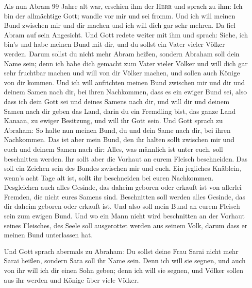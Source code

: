  Als nun Abram 99 Jahre alt war, erschien ihm der
\textsc{Herr} und sprach zu ihm: Ich bin der allmächtige Gott; wandle
vor mir und sei fromm.  Und ich will meinen Bund zwischen
mir und dir machen und ich will dich gar sehr mehren.  Da
fiel Abram auf sein Angesicht. Und Gott redete weiter mit ihm und
sprach:  Siehe, ich bin's und habe meinen Bund mit dir,
und du sollst ein Vater vieler Völker werden.  Darum
sollst du nicht mehr Abram heißen, sondern Abraham soll dein Name sein;
denn ich habe dich gemacht zum Vater vieler Völker  und
will dich gar sehr fruchtbar machen und will von dir Völker machen, und
sollen auch Könige von dir kommen.  Und ich will
aufrichten meinen Bund zwischen mir und dir und deinem Samen nach dir,
bei ihren Nachkommen, dass es ein ewiger Bund sei, also dass ich dein
Gott sei und deines Samens nach dir,  und will dir und
deinem Samen nach dir geben das Land, darin du ein Fremdling bist, das
ganze Land Kanaan, zu ewiger Besitzung, und will ihr Gott sein.
 Und Gott sprach zu Abraham: So halte nun meinen Bund, du
und dein Same nach dir, bei ihren Nachkommen.  Das ist
aber mein Bund, den ihr halten sollt zwischen mir und euch und deinem
Samen nach dir: Alles, was männlich ist unter euch, soll beschnitten
werden.  Ihr sollt aber die Vorhaut an eurem Fleisch
beschneiden. Das soll ein Zeichen sein des Bundes zwischen mir und euch.
 Ein jegliches Knäblein, wenn's acht Tage alt ist, sollt
ihr beschneiden bei euren Nachkommen. Desgleichen auch alles Gesinde,
das daheim geboren oder erkauft ist von allerlei Fremden, die nicht
eures Samens sind.  Beschnitten soll werden alles
Gesinde, das dir daheim geboren oder erkauft ist. Und also soll mein
Bund an eurem Fleisch sein zum ewigen Bund.  Und wo ein
Mann nicht wird beschnitten an der Vorhaut seines Fleisches, des Seele
soll ausgerottet werden aus seinem Volk, darum dass er meinen Bund
unterlassen hat.

 Und Gott sprach abermals zu Abraham: Du sollst deine
Frau Sarai nicht mehr Sarai heißen, sondern Sara soll ihr Name sein.
 Denn ich will sie segnen, und auch von ihr will ich dir
einen Sohn geben; denn ich will sie segnen, und Völker sollen aus ihr
werden und Könige über viele Völker.

